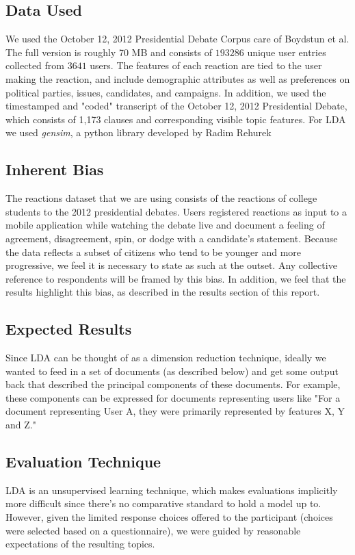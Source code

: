 \subsection{Data Used}
We used the October 12, 2012  Presidential Debate Corpus care of Boydstun et al. The full version is roughly 70 MB and consists of  $193286$ unique user entries collected from $3641$ users.  The features of each reaction are tied to the user making the reaction, and include demographic attributes as well as preferences on political parties, issues, candidates, and campaigns.  In addition, we used the timestamped and "coded" transcript of the October 12, 2012 Presidential Debate, which consists of 1,173 clauses and corresponding visible topic features.
For LDA we used \emph{gensim}, a python library developed by Radim Rehurek \cite{gensim}

\subsection{Inherent Bias}
The reactions dataset that we are using consists of the reactions of college students to the 2012 presidential debates. Users registered reactions as input to a mobile application while watching the debate live and document a feeling of agreement, disagreement, spin, or dodge with a candidate's statement.  Because the data reflects a subset of citizens who tend to be younger and more progressive, we feel it is necessary to state as such at the outset. Any collective reference to respondents will be framed by this bias. In addition, we feel that the results highlight this bias, as described in the results section of this report.

\subsection{Expected Results}
Since LDA can be thought of as a dimension reduction technique, ideally we wanted to feed in a set of documents (as described below) and get some output back that described the principal components of these documents. For example, these components can be expressed for documents representing users like "For a document representing User A, they were primarily represented by features X, Y and Z."

\subsection{Evaluation Technique}
LDA is an unsupervised learning technique, which makes evaluations implicitly more difficult since there's no comparative standard to hold a model up to.  However, given the limited response choices offered to the participant (choices were selected based on a questionnaire), we were guided by reasonable expectations of the resulting topics.

